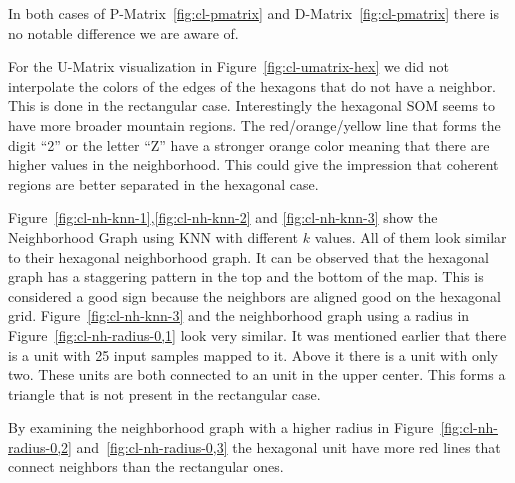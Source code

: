 \documentclass{acm_proc_article-sp}
\begin{document}
In both cases of P-Matrix~\ref{fig:cl-pmatrix} and D-Matrix~\ref{fig:cl-pmatrix} there is no notable difference we are aware of.

For the U-Matrix visualization in Figure~\ref{fig:cl-umatrix-hex} we did not interpolate the colors
of the edges of the hexagons that do not have a neighbor. This is done in the rectangular case. Interestingly the hexagonal SOM seems to have more broader mountain regions. The red/orange/yellow line that forms the digit ``2'' or the letter ``Z'' have a stronger orange color meaning that there are higher values in the neighborhood. This could give the impression that coherent regions are better separated in the hexagonal case.




Figure~\ref{fig:cl-nh-knn-1},\ref{fig:cl-nh-knn-2} and \ref{fig:cl-nh-knn-3} show the Neighborhood Graph using KNN with different $k$ values. All of them look similar to their hexagonal neighborhood graph. It can be observed that the hexagonal graph has a staggering pattern in the top and the bottom of the map.
This is considered a good sign because the neighbors are aligned good on the hexagonal grid.
Figure~\ref{fig:cl-nh-knn-3} and the neighborhood graph using a radius in Figure~\ref{fig:cl-nh-radius-0,1} look very similar.  It was mentioned earlier that there is a unit with 25 input samples mapped to it. Above it there is a unit with only two. These units are both connected to an unit in the upper center. This forms a triangle that is not present in the rectangular case.

By examining the neighborhood graph with a higher radius in Figure~\ref{fig:cl-nh-radius-0,2} and~\ref{fig:cl-nh-radius-0,3} the hexagonal unit have more red lines that connect neighbors than the rectangular ones.

\end{document}
